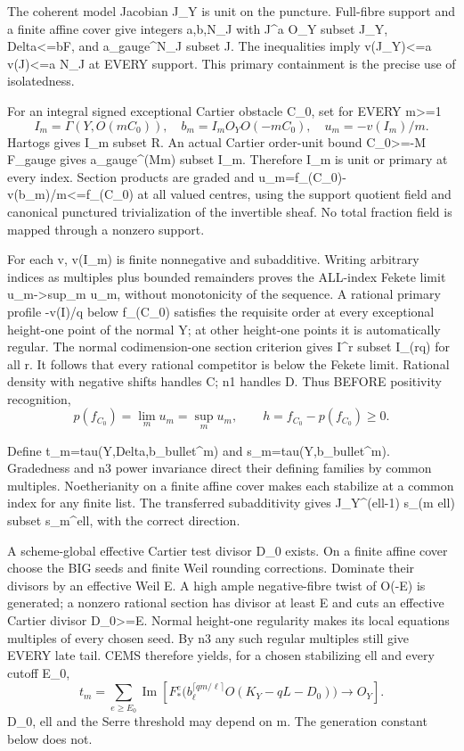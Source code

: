 \documentclass[11pt]{article}
\begin{document}
The coherent model Jacobian J\_Y is unit on the puncture. Full-fibre support and a finite affine cover give integers a,b,N\_J with J\textasciicircum{}a O\_Y subset J\_Y, Delta<=bF, and a\_gauge\textasciicircum{}N\_J subset J. The inequalities imply v(J\_Y)<=a v(J)<=a N\_J at EVERY support. This primary containment is the precise use of isolatedness.

For an integral signed exceptional Cartier obstacle C\_0, set for EVERY m>=1
\[
I_m=\Gamma(Y,O(mC_0)),\quad
b_m=I_mO_Y O(-mC_0),\quad u_m=-v(I_m)/m.
\]
Hartogs gives I\_m subset R. An actual Cartier order-unit bound C\_0>=-M F\_gauge gives a\_gauge\textasciicircum{}(Mm) subset I\_m. Therefore I\_m is unit or primary at every index. Section products are graded and u\_m=f\_(C\_0)-v(b\_m)/m<=f\_(C\_0) at all valued centres, using the support quotient field and canonical punctured trivialization of the invertible sheaf. No total fraction field is mapped through a nonzero support.

For each v, v(I\_m) is finite nonnegative and subadditive. Writing arbitrary indices as multiples plus bounded remainders proves the ALL-index Fekete limit u\_m->sup\_m u\_m, without monotonicity of the sequence. A rational primary profile -v(I)/q below f\_(C\_0) satisfies the requisite order at every exceptional height-one point of the normal Y; at other height-one points it is automatically regular. The normal codimension-one section criterion gives I\textasciicircum{}r subset I\_(rq) for all r. It follows that every rational competitor is below the Fekete limit. Rational density with negative shifts handles C; n1 handles D. Thus BEFORE positivity recognition,
\[
p(f_{C_0})=\lim_m u_m=\sup_m u_m,\qquad h=f_{C_0}-p(f_{C_0})\ge0.
\]

Define t\_m=tau(Y,Delta,b\_bullet\textasciicircum{}m) and s\_m=tau(Y,b\_bullet\textasciicircum{}m). Gradedness and n3 power invariance direct their defining families by common multiples. Noetherianity on a finite affine cover makes each stabilize at a common index for any finite list. The transferred subadditivity gives J\_Y\textasciicircum{}(ell-1) s\_(m ell) subset s\_m\textasciicircum{}ell, with the correct direction.

A scheme-global effective Cartier test divisor D\_0 exists. On a finite affine cover choose the BIG seeds and finite Weil rounding corrections. Dominate their divisors by an effective Weil E. A high ample negative-fibre twist of O(-E) is generated; a nonzero rational section has divisor at least E and cuts an effective Cartier divisor D\_0>=E. Normal height-one regularity makes its local equations multiples of every chosen seed. By n3 any such regular multiples still give EVERY late tail. CEMS therefore yields, for a chosen stabilizing ell and every cutoff E\_0,
\[
t_m=\sum_{e\ge E_0}\operatorname{Im}
\left[F_*^e\big(b_\ell^{\lceil q m/\ell\rceil}
 O(K_Y-qL-D_0)\big)\longrightarrow O_Y\right].
\]
D\_0, ell and the Serre threshold may depend on m. The generation constant below does not.
\end{document}
